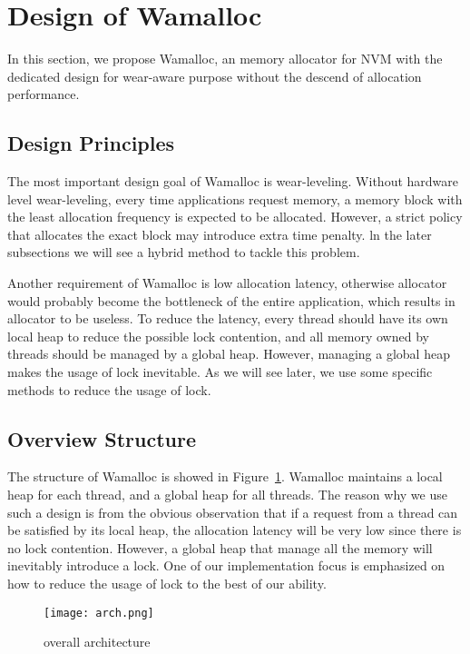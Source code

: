 \documentclass[10pt, conference, compsocconf]{IEEEtran}
\begin{document}
\section{Design of Wamalloc}

In this section, we propose Wamalloc, 
an memory allocator for NVM with the dedicated design for wear-aware purpose 
without the descend of allocation performance.

\subsection{Design Principles}

The most important design goal of Wamalloc is wear-leveling. 
Without hardware level wear-leveling, every time applications request memory,
a memory block with the least allocation frequency is expected to be allocated.
However, a strict policy that allocates the exact block may introduce extra time penalty.
ln the later subsections we will see a hybrid method to tackle this problem.

Another requirement of Wamalloc is low allocation latency,
otherwise allocator would probably become the bottleneck of the entire application,
which results in allocator to be useless. 
To reduce the latency, every thread should have its own local heap to reduce the possible lock contention,
and all memory owned by threads should be managed by a global heap.
However, managing a global heap makes the usage of lock inevitable.
As we will see later, we use some specific methods to reduce the usage of lock.

\subsection{Overview Structure}

The structure of Wamalloc is showed in Figure~\ref{fig:arch}.
Wamalloc maintains a local heap for each thread, and a global heap for all threads.
The reason why we use such a design is from the obvious observation that if a request from a thread can be satisfied by its local heap,
the allocation latency will be very low since there is no lock contention.
However, a global heap that manage all the memory will inevitably introduce a lock.
One of our implementation focus is emphasized on how to reduce the usage of lock to the best of our ability.

\begin{figure}
\centering
\texttt{[image: arch.png]}
\caption{overall architecture}
\label{fig:arch}
\end{figure}
\end{document}
